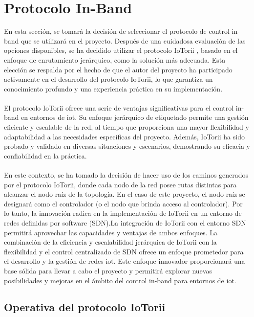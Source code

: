 \section{Protocolo In-Band}
\label{sec:ana_inband}

En esta sección, se tomará la decisión de seleccionar el protocolo de control in-band que se utilizará en el proyecto. Después de una cuidadosa evaluación de las opciones disponibles, se ha decidido utilizar el protocolo IoTorii \cite{rojas2021outperforming}, basado en el enfoque de enrutamiento jerárquico, como la solución más adecuada. Esta elección se respalda por el hecho de que el autor del proyecto ha participado activamente en el desarrollo del protocolo IoTorii, lo que garantiza un conocimiento profundo y una experiencia práctica en su implementación.\\
\\
El protocolo IoTorii ofrece una serie de ventajas significativas para el control in-band en entornos de \gls{iot}. Su enfoque jerárquico de etiquetado permite una gestión eficiente y escalable de la red, al tiempo que proporciona una mayor flexibilidad y adaptabilidad a las necesidades específicas del proyecto. Además, IoTorii ha sido probado y validado en diversas situaciones y escenarios, demostrando su eficacia y confiabilidad en la práctica.\\
\\
En este contexto, se ha tomado la decisión de hacer uso de los caminos generados por el protocolo IoTorii, donde cada nodo de la red posee rutas distintas para alcanzar el nodo raíz de la topología. En el caso de este proyecto, el nodo raíz se designará como el controlador (o el nodo que brinda acceso al controlador). Por lo tanto, la innovación radica en la implementación de IoTorii en un entorno de redes definidas por software (SDN).La integración de IoTorii con el entorno SDN permitirá aprovechar las capacidades y ventajas de ambos enfoques. La combinación de la eficiencia y escalabilidad jerárquica de IoTorii con la flexibilidad y el control centralizado de SDN ofrece un enfoque prometedor para el desarrollo y la gestión de redes \gls{iot}. Este enfoque innovador proporcionará una base sólida para llevar a cabo el proyecto y permitirá explorar nuevas posibilidades y mejoras en el ámbito del control in-band para entornos de \gls{iot}.

\subsection{Operativa del protocolo IoTorii}

